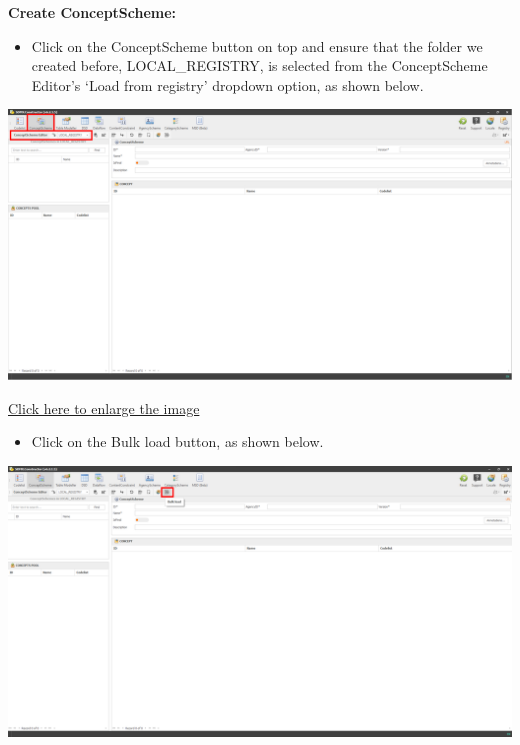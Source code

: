 \documentclass[
]{book}
\providecommand{\tightlist}{%
  \setlength{\itemsep}{0pt}\setlength{\parskip}{0pt}}
\begin{document}
\textbf{Create ConceptScheme:}

\begin{itemize}
\tightlist
\item
  Click on the ConceptScheme button on top and ensure that the folder we created before, LOCAL\_REGISTRY, is selected from the ConceptScheme Editor's `Load from registry' dropdown option, as shown below.
\end{itemize}

\begin{center}\includegraphics[width=1\linewidth]{./images/image100} \end{center}

\href{images/image100.png}{Click here to enlarge the image}

\begin{itemize}
\tightlist
\item
  Click on the Bulk load button, as shown below.
\end{itemize}

\begin{center}\includegraphics[width=1\linewidth]{./images/image102} \end{center}
\end{document}
